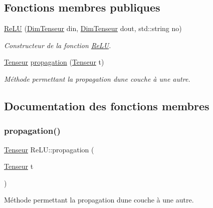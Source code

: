 \subsection*{Fonctions membres publiques}
\begin{DoxyCompactItemize}
\item 
\mbox{\label{classReLU_a818c59b2b84777493cdfb399d896559c}} 
\hyperlink{classReLU_a818c59b2b84777493cdfb399d896559c}{Re\+LU} (\hyperlink{classDimTenseur}{Dim\+Tenseur} din, \hyperlink{classDimTenseur}{Dim\+Tenseur} dout, std\+::string no)
\begin{DoxyCompactList}\small\item\em Constructeur de la fonction \hyperlink{classReLU}{Re\+LU}. \end{DoxyCompactList}\item 
\hyperlink{classTenseur}{Tenseur} \hyperlink{classReLU_a0d42917d6a9124571b0b467c81bce38a}{propagation} (\hyperlink{classTenseur}{Tenseur} t)
\begin{DoxyCompactList}\small\item\em Méthode permettant la propagation d\textquotesingle{}une couche à une autre. \end{DoxyCompactList}\end{DoxyCompactItemize}


\subsection{Documentation des fonctions membres}
\mbox{\label{classReLU_a0d42917d6a9124571b0b467c81bce38a}} 
\subsubsection{\texorpdfstring{propagation()}{propagation()}}
{\footnotesize\ttfamily \hyperlink{classTenseur}{Tenseur} Re\+L\+U\+::propagation (\begin{DoxyParamCaption}\item[{\hyperlink{classTenseur}{Tenseur}}]{t }\end{DoxyParamCaption})\hspace{0.3cm}{\ttfamily [virtual]}}



Méthode permettant la propagation d\textquotesingle{}une couche à une autre. 


